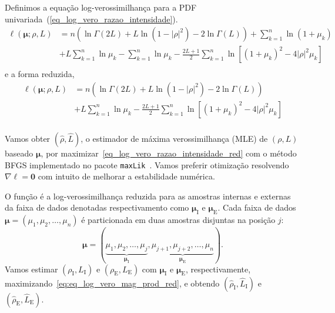 \documentclass[12pt]{article}
\begin{document}
Definimos a equação log-verossimilhança para a PDF univariada~(\ref{eq_log_vero_razao_intensidade}).
\begin{equation}\nonumber
\begin{split}
    \ell(\bm \mu;\rho, L)&=n\left(\ln\Gamma(2L)+L\ln(1-|\rho|^2)-2\ln\Gamma(L)\right)+\sum_{k=1}^{n}\ln(1+\mu_k)\\
                         &+L\sum_{k=1}^{n}\ln\mu_k-\sum_{k=1}^{n}\ln\mu_k-\frac{2L+1}{2}\sum_{k=1}^{n} \ln\left[(1+\mu_k)^2-4|\rho|^2\mu_k\right]\\
\end{split}
 \end{equation}
e a forma reduzida,
\begin{equation}\label{eq_log_vero_razao_intensidade_red}
\begin{split}
    \ell(\bm \mu;\rho, L)&=n\left(\ln\Gamma(2L)+L\ln(1-|\rho|^2)-2\ln\Gamma(L)\right)\\
                         &+L\sum_{k=1}^{n}\ln\mu_k-\frac{2L+1}{2}\sum_{k=1}^{n} \ln\left[(1+\mu_k)^2-4|\rho|^2\mu_k\right]\\
\end{split}
 \end{equation} 

Vamos obter $(\widehat \rho, \widehat L)$, o estimador de máxima verossimilhança (MLE) de $(\rho, L)$ baseado $\bm \mu$, por maximizar~\eqref{eq_log_vero_razao_intensidade_red} com o método BFGS implementado no pacote \texttt{maxLik}~\citep{ht}. Vamos preferir otimização resolvendo $\nabla\ell=\bm 0$ com intuito de melhorar a estabilidade numérica.

O função é a log-verossimilhança reduzida para as amostras internas e externas da faixa de dados denotadas respectivamento como $\bm \mu_\text{I}$ e $\bm \mu_\text{E}$. Cada faixa de dados $\bm \mu = (\mu_1,\mu_2,\dots,\mu_n)$ é particionada em duas amostras disjuntas na posição $j$:  
$$
\bm \mu = (\underbrace{\mu_1,\mu_2,\dots,\mu_j}_{\bm \mu_\text{I}}, 
\underbrace{\mu_{j+1}, \mu_{j+2},\dots,\mu_n}_{\bm \mu_\text{E}}).
$$
Vamos estimar $(\rho_\text{I},L_\text{I})$ e $(\rho_\text{E},L_\text{E})$ com $\bm \mu_\text{I}$ e $\bm \mu_\text{E}$, respectivamente, maximizando~\eqref{eq:eq_log_vero_mag_prod_red}, e obtendo $(\widehat{\rho}_\text{I}, \widehat{L}_\text{I})$ e $(\widehat{\rho}_\text{E}, \widehat{L}_\text{E})$.
\end{document}
